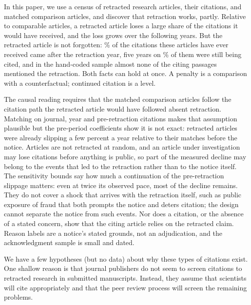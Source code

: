 \documentclass[11pt,letterpaper]{article}
\begin{document}
In this paper, we use a census of retracted research articles, their citations, and matched comparison articles, and discover that retraction works, partly. Relative to comparable articles, a retracted article loses a large share of the citations it would have received, and the loss grows over the following years. But the retracted article is not forgotten: \PostAfterShare\% of the citations these articles have ever received came after the retraction year, five years on \PostCitedAtFive\% of them were still being cited, and in the hand-coded sample almost none of the citing passages mentioned the retraction. Both facts can hold at once. A penalty is a comparison with a counterfactual; continued citation is a level.

The causal reading requires that the matched comparison articles follow the citation path the retracted article would have followed absent retraction. Matching on journal, year and pre-retraction citations makes that assumption plausible but the pre-period coefficients show it is not exact: retracted articles were already slipping a few percent a year relative to their matches before the notice. Articles are not retracted at random, and an article under investigation may lose citations before anything is public, so part of the measured decline may belong to the events that led to the retraction rather than to the notice itself. The sensitivity bounds say how much a continuation of the pre-retraction slippage matters: even at twice its observed pace, most of the decline remains. They do not cover a shock that arrives with the retraction itself, such as public exposure of fraud that both prompts the notice and deters citation; the design cannot separate the notice from such events. Nor does a citation, or the absence of a stated concern, show that the citing article relies on the retracted claim. Reason labels are a notice's stated grounds, not an adjudication, and the acknowledgment sample is small and dated.

We have a few hypotheses (but no data) about why these types of citations exist. One shallow reason is that journal publishers do not seem to screen citations to retracted research in submitted manuscripts. Instead, they assume that scientists will cite appropriately and that the peer review process will screen the remaining problems.
\end{document}
